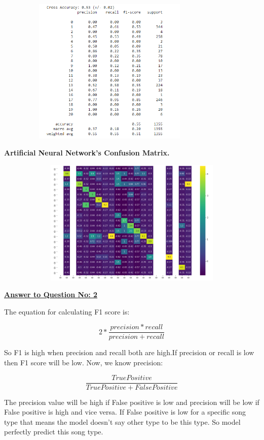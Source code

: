 \documentclass[11pt]{article}
\begin{document}
\includegraphics[width=11cm, height=7cm]{ArtificialNeuralNetworkModel}

\begin{center}
\bf Artificial Neural Network's Confusion Matrix.
\end{center}

\includegraphics[width=16cm, height=6cm]{ArtificialNeuralNetworkMatrix}


\begin{center}
\bf  \underline{Answer to Question No: 2} \\ 
\end{center} 

The equation for calculating F1 score is:

\[
2*\frac{precision*recall}{precision + recall}
\]

So F1 is high when precision and recall both are high.If precision or
recall is low then F1 score will be low. Now, we know precision:

\[
\frac{True Positive}{True Positive + False Positive}
\]

The precision value will be high if False positive is low and precision will be low if False
positive is high and vice versa. If False positive is low for a specific song type that means
the model doesn’t say other type to be this type. So model perfectly predict this song
type. \\
\end{document}

